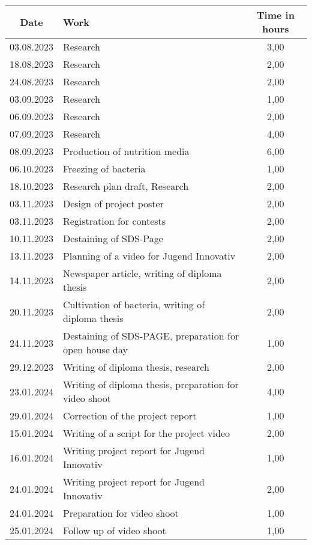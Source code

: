 \begin{longtable}{|c|p{9cm}|c|}
    \hline
    \textbf{Date} & \textbf{Work} & \textbf{Time in hours}  \\ \endhead \hline
    03.08.2023 & Research & 3,00 \\ \hline
    18.08.2023 & Research & 2,00 \\ \hline
    24.08.2023 & Research & 2,00 \\ \hline
    03.09.2023 & Research & 1,00 \\ \hline
    06.09.2023 & Research & 2,00 \\ \hline
    07.09.2023 & Research & 4,00 \\ \hline
    08.09.2023 & Production of nutrition media & 6,00 \\ \hline
    06.10.2023 & Freezing of bacteria & 1,00 \\ \hline
    18.10.2023 & Research plan draft, Research & 2,00 \\ \hline
    03.11.2023 & Design of project poster & 2,00 \\ \hline
    03.11.2023 & Registration for contests & 2,00 \\ \hline
    10.11.2023 & Destaining of SDS-Page & 2,00 \\ \hline
    13.11.2023 & Planning of a video for Jugend Innovativ & 2,00 \\ \hline
    14.11.2023 & Newspaper article, writing of diploma thesis & 2,00 \\ \hline
    20.11.2023 & Cultivation of bacteria, writing of diploma thesis & 2,00 \\ \hline
    24.11.2023 & Destaining of SDS-PAGE, preparation for open house day & 1,00 \\ \hline
    29.12.2023 & Writing of diploma thesis, research & 2,00 \\ \hline
    23.01.2024 & Writing of diploma thesis, preparation for video shoot & 4,00 \\ \hline
    29.01.2024 & Correction of the project report & 1,00 \\ \hline
    15.01.2024 & Writing of a script for the project video & 2,00 \\ \hline
    16.01.2024 & Writing project report for Jugend Innovativ & 1,00 \\ \hline
    24.01.2024 & Writing project report for Jugend Innovativ & 2,00 \\ \hline
    24.01.2024 & Preparation for video shoot & 1,00 \\ \hline
    25.01.2024 & Follow up of video shoot & 1,00 \\ \hline

\end{longtable}

